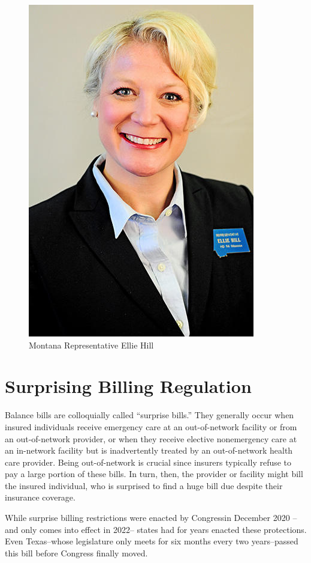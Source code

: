 \documentclass[
  oneside]{book}
\begin{document}
\begin{figure}

{\centering \includegraphics[width=0.33\linewidth]{Plots/Web/ellie-hill-mtleg} 

}

\caption{Montana Representative Ellie Hill}\label{fig:intro-elliehill}
\end{figure}

\hypertarget{surprising-billing-regulation}{%
\section{Surprising Billing Regulation}\label{surprising-billing-regulation}}

Balance bills are colloquially called ``surprise bills.'' They generally occur when insured individuals receive emergency care at an out-of-network facility or from an out-of-network provider, or when they receive elective nonemergency care at an in-network facility but is inadvertently treated by an out-of-network health care provider. Being out-of-network is crucial since insurers typically refuse to pay a large portion of these bills. In turn, then, the provider or facility might bill the insured individual, who is surprised to find a huge bill due despite their insurance coverage.

While surprise billing restrictions were enacted by Congressin December 2020 -- and only comes into effect in 2022-- states had for years enacted these protections. Even Texas--whose legislature only meets for six months every two years--passed this bill before Congress finally moved.
\end{document}
